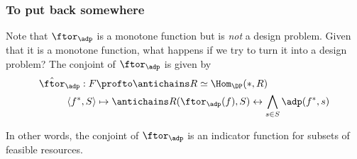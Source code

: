 \subsubsection{To put back somewhere}
Note that $\ftor_\adp$ is a monotone function but is \emph{not} a design problem. Given that it is a monotone function, what happens if we try to turn it into a design problem? The conjoint of $\ftor_\adp$ is given by
\begin{equation*}
    \begin{aligned}
        \hat \ftor_\adp : F &\profto \antichains R \simeq \Hom_\DP(\ast, R) \\
        \langle f^*, S \rangle &\mapsto \antichains R(\ftor_\adp(f), S) \leftrightarrow \bigwedge_{s\in S} \adp(f^*, s)
    \end{aligned}
\end{equation*}

In other words, the conjoint of $\ftor_\adp$ is an indicator function for subsets of feasible resources.

